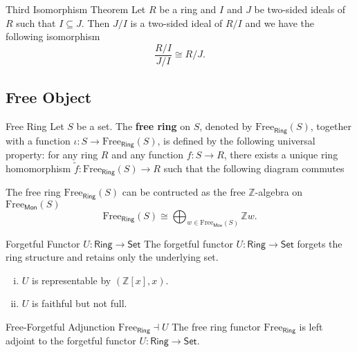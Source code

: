 \begin{theorem}{Third Isomorphism Theorem}{}
    Let $R$ be a ring and $I$ and $J$ be two-sided ideals of $R$ such that $I\subseteq J$. Then $J/I$ is a two-sided ideal of $R/I$ and we have the following isomorphism
    \[
        \frac{R/I}{J/I}\cong R/J.
    \]    
\end{theorem}


\subsection{Free Object}
\begin{definition}{Free Ring}{}
    Let $S$ be a set. The \textbf{free ring} on $S$, denoted by $\mathrm{Free}_{\mathsf{Ring}}(S)$, together with a function $\iota:S\to \mathrm{Free}_{\mathsf{Ring}}(S)$, is defined by the following universal property: for any ring $R$ and any function $f:S\to R$, there exists a unique ring homomorphism $\widetilde{f}:\mathrm{Free}_{\mathsf{Ring}}(S)\to R$ such that the following diagram commutes
    \begin{center}
    \end{center}
    The free ring $\mathrm{Free}_{\mathsf{Ring}}(S)$ can be contructed as the free $\mathbb{Z}$-algebra on $\mathrm{Free}_{\mathsf{Mon}}(S)$
    \[
        \mathrm{Free}_{\mathsf{Ring}}(S)\cong\bigoplus_{w\in\mathrm{Free}_{\mathsf{Mon}}(S)}\mathbb{Z}w.  
    \]
\end{definition}


\begin{example}{Forgetful Functor $U:\mathsf{Ring}\to\mathsf{Set}$}{}
    The forgetful functor $U:\mathsf{Ring}\to\mathsf{Set}$ forgets the ring structure and retains only the underlying set.
    \begin{enumerate}[(i)]
        \item $U$ is representable by $\left(\mathbb{Z}[x],x\right)$.
        \item $U$ is faithful but not full.
    \end{enumerate}
\end{example}


\begin{proposition}{Free-Forgetful Adjunction $\mathrm{Free}_{\mathsf{Ring}}\dashv U$}{}
    The free ring functor $\mathrm{Free}_{\mathsf{Ring}}$ is left adjoint to the forgetful functor $U:\mathsf{Ring}\to\mathsf{Set}$.
\end{proposition}





